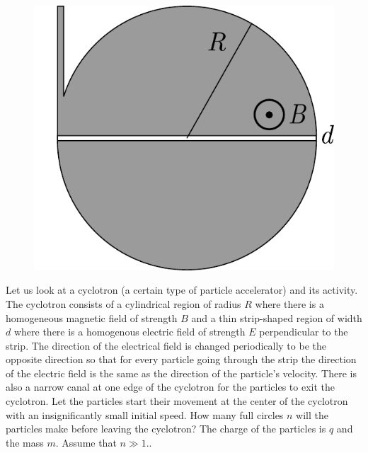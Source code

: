\documentclass[11pt]{article}
\begin{document}
\probeng
\begin{figure}
	\begin{center}
		\includegraphics[width=\linewidth]{2018-v2g-10-tsyklotron}
	\end{center}
\end{figure}
Let us look at a cyclotron (a certain type of particle accelerator) and its activity. The cyclotron consists of a cylindrical region of radius $R$ where there is a homogeneous magnetic field of strength $B$ and a thin strip-shaped region of width $d$ where there is a homogenous electric field of strength $E$ perpendicular to the strip. The direction of the electrical field is changed periodically to be the opposite direction so that for every particle going through the strip the direction of the electric field is the same as the direction of the particle’s velocity. There is also a narrow canal at one edge of the cyclotron for the particles to exit the cyclotron. Let the particles start their movement at the center of the cyclotron with an insignificantly small initial speed. How many full circles $n$ will the particles make before leaving the cyclotron? The charge of the particles is $q$ and the mass $m$. Assume that $n\gg 1.$.
\probend
\bigskip

\end{document}
